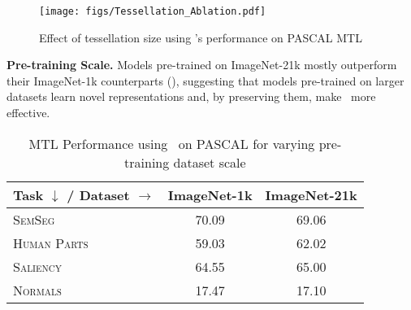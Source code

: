 \begin{figure}[t]
  \centering\texttt{[image: figs/Tessellation\_Ablation.pdf]}
  \caption{Effect of tessellation size using \ourmethod's performance on PASCAL MTL}
  \label{fig:ab5}
\end{figure}

\noindent\textbf{Pre-training Scale.} Models pre-trained on ImageNet-21k mostly outperform their ImageNet-1k counterparts (), suggesting that models pre-trained on larger datasets learn novel representations and, by preserving them, make \ourmethod\ more effective.
\begin{table}[ht]
    \centering
     \caption{MTL Performance using \ourmethod\ on PASCAL for varying pre-training dataset scale}
    \begin{tabular}{lcc}
       \toprule
       \textbf{Task} $\downarrow$ / \textbf{Dataset} $\rightarrow$ & \textbf{ImageNet-1k} & \textbf{ImageNet-21k} \\
       \midrule
       \textsc{SemSeg} & 70.09 & 69.06 \\
       \textsc{Human Parts} & 59.03 & 62.02\\
       \textsc{Saliency} & 64.55 & 65.00\\
       \textsc{Normals} & 17.47 & 17.10\\
       \bottomrule
    \end{tabular}
    \label{tab:pretrainsize}
\end{table}


